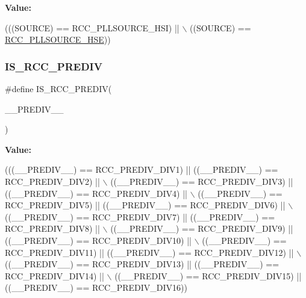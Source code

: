 {\bfseries Value\+:}
\begin{DoxyCode}
(((SOURCE) == RCC\_PLLSOURCE\_HSI)   || \(\backslash\)
                                  ((SOURCE) == \hyperlink{group___r_c_c___p_l_l___clock___source_ga197cea7fe5c2db26fe7fcdb0f99dd4d7}{RCC\_PLLSOURCE\_HSE}))
\end{DoxyCode}
\mbox{\label{group___r_c_c___private___macros_ga6a93e91c36425b2447523ceef63e7d53}} 
\subsubsection{\texorpdfstring{I\+S\+\_\+\+R\+C\+C\+\_\+\+P\+R\+E\+D\+IV}{IS\_RCC\_PREDIV}}
{\footnotesize\ttfamily \#define I\+S\+\_\+\+R\+C\+C\+\_\+\+P\+R\+E\+D\+IV(\begin{DoxyParamCaption}\item[{}]{\+\_\+\+\_\+\+P\+R\+E\+D\+I\+V\+\_\+\+\_\+ }\end{DoxyParamCaption})}

{\bfseries Value\+:}
\begin{DoxyCode}
(((\_\_PREDIV\_\_) == RCC\_PREDIV\_DIV1)  || ((\_\_PREDIV\_\_) == RCC\_PREDIV\_DIV2)   || \(\backslash\)
                                  ((\_\_PREDIV\_\_) == RCC\_PREDIV\_DIV3)  || ((\_\_PREDIV\_\_) == RCC\_PREDIV\_DIV4)  
       || \(\backslash\)
                                  ((\_\_PREDIV\_\_) == RCC\_PREDIV\_DIV5)  || ((\_\_PREDIV\_\_) == RCC\_PREDIV\_DIV6)  
       || \(\backslash\)
                                  ((\_\_PREDIV\_\_) == RCC\_PREDIV\_DIV7)  || ((\_\_PREDIV\_\_) == RCC\_PREDIV\_DIV8)  
       || \(\backslash\)
                                  ((\_\_PREDIV\_\_) == RCC\_PREDIV\_DIV9)  || ((\_\_PREDIV\_\_) == RCC\_PREDIV\_DIV10) 
       || \(\backslash\)
                                  ((\_\_PREDIV\_\_) == RCC\_PREDIV\_DIV11) || ((\_\_PREDIV\_\_) == RCC\_PREDIV\_DIV12) 
       || \(\backslash\)
                                  ((\_\_PREDIV\_\_) == RCC\_PREDIV\_DIV13) || ((\_\_PREDIV\_\_) == RCC\_PREDIV\_DIV14) 
       || \(\backslash\)
                                  ((\_\_PREDIV\_\_) == RCC\_PREDIV\_DIV15) || ((\_\_PREDIV\_\_) == RCC\_PREDIV\_DIV16))
\end{DoxyCode}
\mbox{\label{group___r_c_c___private___macros_gacd1d98013cd9a28e8b1544adf931e7b3}} 

